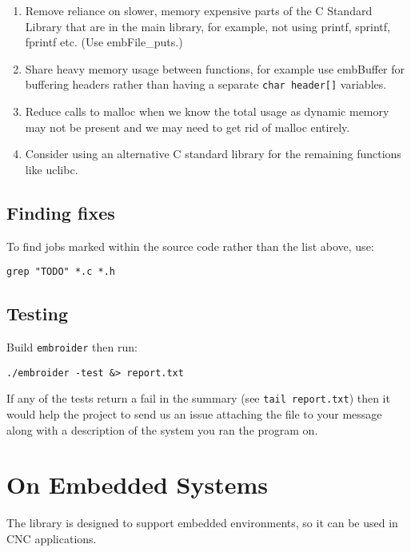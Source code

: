 \documentclass[onesize, a4paper]{refart}
\providecommand{\tightlist}{\setlength{\itemsep}{0pt}\setlength{\parskip}{0pt}}
\begin{document}
\begin{enumerate}
  \begin{enumerate}
  \def\labelenumii{\arabic{enumii}.}
  \tightlist
  \item Remove reliance on slower, memory expensive parts of the C Standard
    Library that are in the main library, for example, not using printf,
    sprintf, fprintf etc. (Use embFile\_puts.)
  \item Share heavy memory usage between functions, for example use
    embBuffer for buffering headers rather than having a separate
    \texttt{char\ header{[}{]}} variables.
  \item Reduce calls to malloc when we know the total usage as dynamic
    memory may not be present and we may need to get rid of malloc
    entirely.
  \item Consider using an alternative C standard library for the remaining
    functions like uclibc.
  \end{enumerate}
\end{enumerate}

\subsection{Finding fixes}

To find jobs marked within the source code rather than the list above,
use:

\begin{verbatim}
grep "TODO" *.c *.h
\end{verbatim}

\subsection{Testing}

Build \texttt{embroider} then run:

\begin{verbatim}
./embroider -test &> report.txt
\end{verbatim}

If any of the tests return a fail in the summary (see
\texttt{tail\ report.txt}) then it would help the project to send us an
issue attaching the file to your message along with a description of
the system you ran the program on.

\section{On Embedded Systems}

The library is designed to support embedded environments, so it can
be used in CNC applications.
\end{document}
